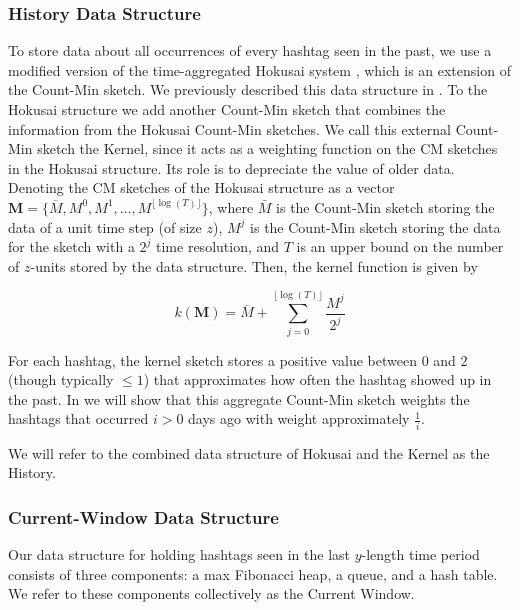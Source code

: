 \documentclass[twoside]{article}
\newcommand{\nref}[1]
 {\textbf{\nameref{#1}}}
\newcommand{\cc}[1]
 {\textbf{\cite{#1}}}
\begin{document}
\subsubsection{History Data Structure}

To store data about all occurrences of every hashtag seen in the past, we use a modified version of the time-aggregated Hokusai system \cc{Matusevych:2012}, which is an extension of the Count-Min sketch. We previously described this data structure in \nref{sec:PreviousWork}. 
To the Hokusai structure we add another Count-Min sketch that combines the information from the Hokusai Count-Min sketches. We call this external Count-Min sketch the Kernel, since it acts as a weighting function on the CM sketches in the Hokusai structure. Its role is to depreciate the value of older data.
Denoting the CM sketches of the Hokusai structure as a vector $\textbf{M} = \{\overline{M}, M^0, M^1, ..., M^{{\lfloor {\log(T)} \rfloor}}\}$, where $\bar{M}$ is the Count-Min sketch storing the data of a unit time step (of size $z$), $M^j$ is the Count-Min sketch storing the data for the sketch with a $2^j$ time resolution, and $T$ is an upper bound on the number of $z$-units stored by the data structure. Then, the kernel function is given by

\begin{equation} 
\label{eq:kernel}
\textit{k}(\textbf{M}) = \overline{M} + \sum\limits_{j=0}^{{\lfloor \log⁡(T) \rfloor}} \frac{M^j}{2^j}
\end{equation}

For each hashtag, the kernel sketch stores a positive value between $0$ and $2$ (though typically $\leq 1$) that approximates how often the hashtag showed up in the past. In \nref{sec:Correctness} we will show that this aggregate Count-Min sketch weights the hashtags that occurred $i > 0$ days ago with weight approximately $\frac{1}{i}$.

We will refer to the combined data structure of Hokusai and the Kernel as the History.

\subsubsection{Current-Window Data Structure}

Our data structure for holding hashtags seen in the last $y$-length time period consists of three components: a max Fibonacci heap, a queue, and a hash table.  We refer to these components collectively as the Current Window.
\end{document}
